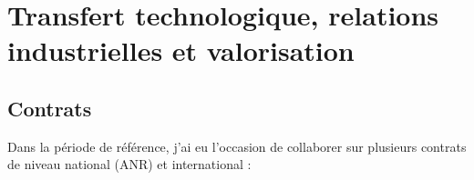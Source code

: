 \section{Transfert technologique, relations industrielles et valorisation} %


\subsection{Contrats} %
Dans la période de référence, j'ai eu l'occasion de collaborer sur plusieurs contrats de niveau national (ANR) et international :%

